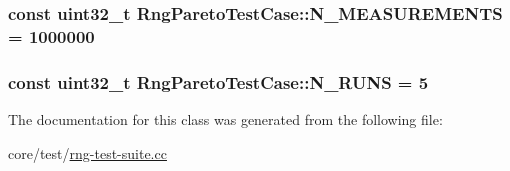 \subsubsection[{\texorpdfstring{N\+\_\+\+M\+E\+A\+S\+U\+R\+E\+M\+E\+N\+TS}{N_MEASUREMENTS}}]{\setlength{\rightskip}{0pt plus 5cm}const uint32\+\_\+t Rng\+Pareto\+Test\+Case\+::\+N\+\_\+\+M\+E\+A\+S\+U\+R\+E\+M\+E\+N\+TS = 1000000\hspace{0.3cm}{\ttfamily [static]}}\hypertarget{classRngParetoTestCase_a61b9950680068b32138272422b85405c}{}\label{classRngParetoTestCase_a61b9950680068b32138272422b85405c}
\subsubsection[{\texorpdfstring{N\+\_\+\+R\+U\+NS}{N_RUNS}}]{\setlength{\rightskip}{0pt plus 5cm}const uint32\+\_\+t Rng\+Pareto\+Test\+Case\+::\+N\+\_\+\+R\+U\+NS = 5\hspace{0.3cm}{\ttfamily [static]}}\hypertarget{classRngParetoTestCase_a08aa14adfe517ce6bce686b6a62b9f4b}{}\label{classRngParetoTestCase_a08aa14adfe517ce6bce686b6a62b9f4b}


The documentation for this class was generated from the following file\+:\begin{DoxyCompactItemize}
\item 
core/test/\hyperlink{rng-test-suite_8cc}{rng-\/test-\/suite.\+cc}\end{DoxyCompactItemize}
